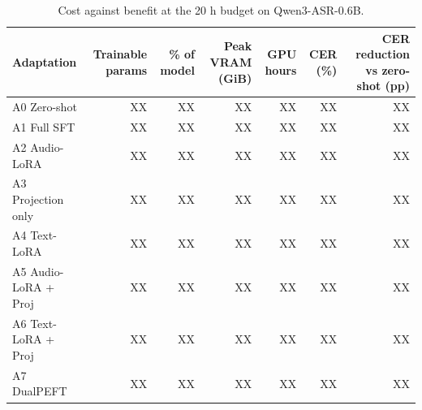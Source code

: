 \begin{table}[t]
\centering
\caption{Cost against benefit at the 20 h budget on Qwen3-ASR-0.6B.}
\label{tab:table7_parameter_efficiency}
\begin{tabular}{lrrrrrr}
\toprule
Adaptation & Trainable params & \% of model & Peak VRAM (GiB) & GPU hours & CER (\%) & CER reduction vs zero-shot (pp) \\
\midrule
A0 Zero-shot & XX & XX & XX & XX & XX & XX \\
A1 Full SFT & XX & XX & XX & XX & XX & XX \\
A2 Audio-LoRA & XX & XX & XX & XX & XX & XX \\
A3 Projection only & XX & XX & XX & XX & XX & XX \\
A4 Text-LoRA & XX & XX & XX & XX & XX & XX \\
A5 Audio-LoRA + Proj & XX & XX & XX & XX & XX & XX \\
A6 Text-LoRA + Proj & XX & XX & XX & XX & XX & XX \\
A7 DualPEFT & XX & XX & XX & XX & XX & XX \\
\bottomrule
\end{tabular}
\end{table}
